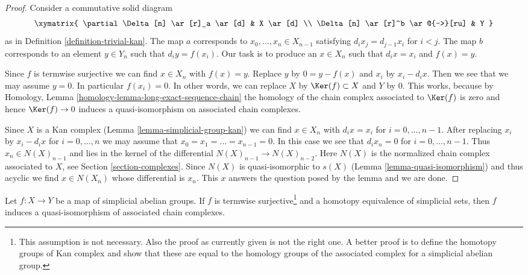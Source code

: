 \begin{proof}
Consider a commutative solid diagram
$$
\xymatrix{
\partial \Delta[n] \ar[r]_a \ar[d] & X \ar[d] \\
\Delta[n] \ar[r]^b \ar@{-->}[ru] & Y
}
$$
as in Definition \ref{definition-trivial-kan}. The map $a$ corresponds
to $x_0, \ldots, x_n \in X_{n - 1}$ satisfying $d_i x_j = d_{j - 1} x_i$
for $i < j$. The map $b$ corresponds to an element $y \in Y_n$ such
that $d_iy = f(x_i)$. Our task is to produce an $x \in X_n$ such that
$d_ix = x_i$ and $f(x) = y$.

\medskip\noindent
Since $f$ is termwise surjective we can find $x \in X_n$ with $f(x) = y$.
Replace $y$ by $0 = y - f(x)$ and $x_i$ by $x_i - d_ix$. Then we
see that we may assume $y = 0$. In particular $f(x_i) = 0$.
In other words, we can replace $X$ by $\Ker(f) \subset X$
and $Y$ by $0$. This works, because by
Homology, Lemma \ref{homology-lemma-long-exact-sequence-chain}
the homology of the chain complex associated to $\Ker(f)$
is zero and hence $\Ker(f) \to 0$ induces a quasi-isomorphism
on associated chain complexes.

\medskip\noindent
Since $X$ is a Kan complex (Lemma \ref{lemma-simplicial-group-kan})
we can find $x \in X_n$ with $d_i x = x_i$ for $i = 0, \ldots, n - 1$.
After replacing $x_i$ by $x_i - d_ix$ for $i = 0, \ldots, n$ we
may assume that $x_0 = x_1 = \ldots = x_{n - 1} = 0$.
In this case we see that $d_i x_n = 0$ for $i = 0, \ldots, n - 1$.
Thus $x_n \in N(X)_{n - 1}$ and lies in the kernel of the differential
$N(X)_{n - 1} \to N(X)_{n - 2}$. Here $N(X)$ is the normalized chain
complex associated to $X$, see Section \ref{section-complexes}.
Since $N(X)$ is quasi-isomorphic to $s(X)$
(Lemma \ref{lemma-quasi-isomorphism})
and thus acyclic we find $x \in N(X_n)$ whose differential is $x_n$.
This $x$ answers the question posed by the lemma and we are done.
\end{proof}

\begin{lemma}
\label{lemma-homotopy-equivalence}
Let $f : X \to Y$ be a map of simplicial abelian groups.
If $f$ is termwise surjective\footnote{This assumption is not
necessary. Also the proof as currently given is not the right one.
A better proof is to define the homotopy groups of Kan complex
and show that these are equal to the homology groups of the associated
complex for a simplicial abelian group.} and a homotopy equivalence of
simplicial sets, then $f$ induces a quasi-isomorphism of associated
chain complexes.
\end{lemma}

